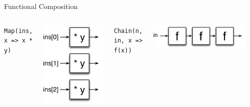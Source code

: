 \documentclass[xcolor=pdflatex,dvipsnames,table]{beamer}
\begin{document}
\begin{frame}[fragile]{Functional Composition}
\begin{columns}

\verb+Map(ins, x => x * y)+ \\
\begin{center}
\includegraphics[height=0.6\textheight]{../bootcamp/figs/map.pdf} \\[2cm]
\end{center}

\vskip2mm
\verb+Chain(n, in, x => f(x))+ \\
\begin{center}
\includegraphics[width=0.9\textwidth]{../bootcamp/figs/chain.pdf} \\
\end{center}


\end{columns}
\end{frame}
\end{document}
